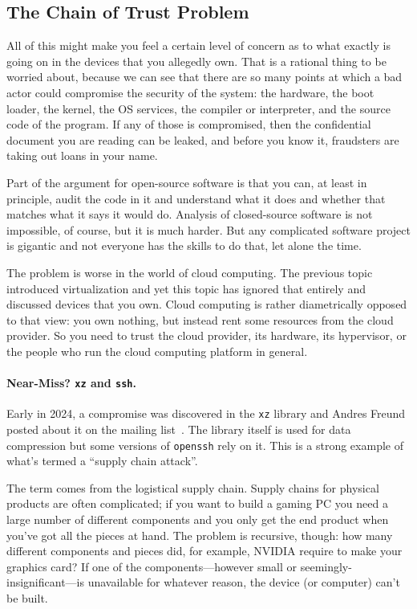 \subsection*{The Chain of Trust Problem}
All of this might make you feel a certain level of concern as to what exactly is going on in the devices that you allegedly own. That is a rational thing to be worried about, because we can see that there are so many points at which a bad actor could compromise the security of the system: the hardware, the boot loader, the kernel, the OS services, the compiler or interpreter, and the source code of the program. If any of those is compromised, then the confidential document you are reading can be leaked, and before you know it, fraudsters are taking out loans in your name.

Part of the argument for open-source software is that you can, at least in principle, audit the code in it and understand what it does and whether that matches what it says it would do. Analysis of closed-source software is not impossible, of course, but it is much harder. But any complicated software project is gigantic and not everyone has the skills to do that, let alone the time.

The problem is worse in the world of cloud computing. The previous topic introduced virtualization and yet this topic has ignored that entirely and discussed devices that you own. Cloud computing is rather diametrically opposed to that view: you own nothing, but instead rent some resources from the cloud provider. So you need to trust the cloud provider, its hardware, its hypervisor, or the people who run the cloud computing platform in general. 

\paragraph{Near-Miss? \texttt{xz} and \texttt{ssh}.} Early in 2024, a compromise was discovered in the \texttt{xz} library and Andres Freund posted about it on the mailing list~\cite{xzlib}. The library itself is used for data compression but some versions of \texttt{openssh} rely on it. This is a strong example of what's termed a ``supply chain attack''. 

The term comes from the logistical supply chain. Supply chains for physical products are often complicated; if you want to build a gaming PC you need a large number of different components and you only get the end product when you've got all the pieces at hand. The problem is recursive, though: how many different components and pieces did, for example, NVIDIA require to make your graphics card? If one of the components---however small or seemingly-insignificant---is unavailable for whatever reason, the device (or computer) can't be built. 

